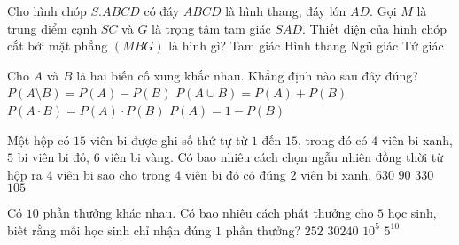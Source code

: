 \begin{ex}%
	Cho hình chóp $S.ABCD$ có đáy $ABCD$ là hình thang, đáy lớn $AD$. Gọi $M$ là trung điểm cạnh $SC$ và $G$ là trọng tâm tam giác  $SAD$. Thiết diện của hình chóp cắt bởi mặt phẳng $(MBG)$ là hình gì?
	\choice
	{Tam giác}
	{Hình thang}
	{Ngũ giác}
	{\True Tứ giác}
\end{ex}
\begin{ex}%
	Cho $A$ và $B$ là hai biến cố xung khắc nhau. Khẳng định nào sau đây đúng?
	\choice
	{$P(A\setminus B)=P(A)-P(B)$}
	{\True $P(A\cup B)=P(A)+P(B)$}
	{$P(A\cdot B)=P(A)\cdot P(B)$}
	{$P(A)=1-P(B)$}
\end{ex}
\begin{ex}%
	Một hộp có $15$ viên bi được ghi số thứ tự từ $1$ đến $15$, trong đó có $4$ viên bi xanh, $5$ bi viên bi đỏ, $6$ viên bi vàng. Có bao nhiêu cách chọn ngẫu nhiên đồng thời từ hộp ra $4$ viên bi sao cho trong $4$ viên bi đó có đúng $2$ viên bi xanh.
	\choice
	{$630$}
	{$90$}
	{\True $330$}
	{$105$}
\end{ex}
\begin{ex}%
	Có $10$ phần thưởng khác nhau. Có bao nhiêu cách phát thưởng cho $5$ học sinh, biết rằng mỗi học sinh chỉ nhận đúng $1$ phần thưởng?
	\choice
	{$252$}
	{\True $30240$}
	{$10^5$}
	{$5^{10}$}
\end{ex}
